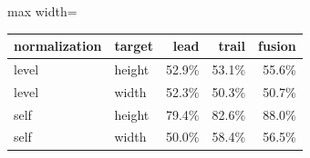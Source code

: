 \begin{adjustbox}{max width=\textwidth}
{\footnotesize
\begin{tabular}{llrrr}
\toprule
\textbf{normalization} & \textbf{target} & \textbf{lead} & \textbf{trail} & \textbf{fusion} \\
\midrule
level & height & 52.9\% & 53.1\% & 55.6\% \\
level & width & 52.3\% & 50.3\% & 50.7\% \\
self & height & 79.4\% & 82.6\% & 88.0\% \\
self & width & 50.0\% & 58.4\% & 56.5\% \\
\bottomrule
\end{tabular}
}
\end{adjustbox}
